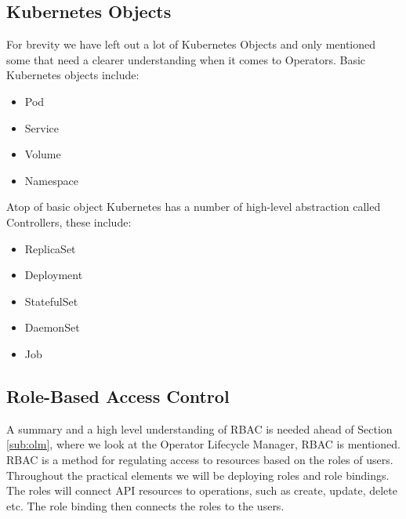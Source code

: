 \subsection{Kubernetes Objects}
For brevity we have left out a lot of Kubernetes Objects and only mentioned some that need a clearer understanding when it comes to Operators. Basic Kubernetes objects include:
\begin{itemize}
    \item Pod
    \item Service
    \item Volume
    \item Namespace
\end{itemize}
Atop of basic object Kubernetes has a number of high-level abstraction called Controllers, these include:
\begin{itemize}
    \item ReplicaSet
    \item Deployment
    \item StatefulSet
    \item DaemonSet
    \item Job
\end{itemize}

\subsection{Role-Based Access Control}
A summary and a high level understanding of RBAC is needed ahead of Section \ref{sub:olm}, where we look at the Operator Lifecycle Manager, RBAC is mentioned.
\\RBAC is a method for regulating access to resources based on the roles of users. Throughout the practical elements we will be deploying roles and role bindings. The roles will connect API resources to operations, such as create, update, delete etc. The role binding then connects the roles to the users. 